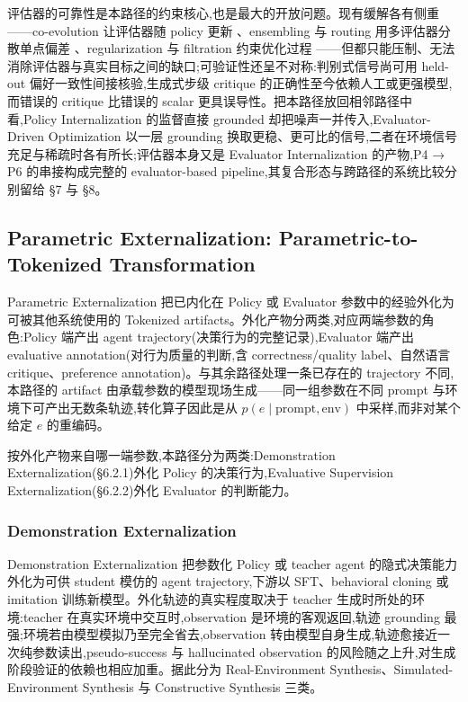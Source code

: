评估器的可靠性是本路径的约束核心,也是最大的开放问题。现有缓解各有侧重——co-evolution 让评估器随 policy 更新 \cite{Yua24, Wu24d, Li26l}、ensembling 与 routing 用多评估器分散单点偏差 \cite{Wu25x, Xu24d}、regularization 与 filtration 约束优化过程 \cite{Ack26, She24c}——但都只能压制、无法消除评估器与真实目标之间的缺口;可验证性还呈不对称:判别式信号尚可用 held-out 偏好一致性间接核验,生成式步级 critique 的正确性至今依赖人工或更强模型,而错误的 critique 比错误的 scalar 更具误导性。把本路径放回相邻路径中看,Policy Internalization 的监督直接 grounded 却把噪声一并传入,Evaluator-Driven Optimization 以一层 grounding 换取更稳、更可比的信号,二者在环境信号充足与稀疏时各有所长;评估器本身又是 Evaluator Internalization 的产物,P4 → P6 的串接构成完整的 evaluator-based pipeline,其复合形态与跨路径的系统比较分别留给 §7 与 §8。

\subsection{Parametric Externalization: Parametric-to-Tokenized Transformation}

Parametric Externalization 把已内化在 Policy 或 Evaluator 参数中的经验外化为可被其他系统使用的 Tokenized artifacts。外化产物分两类,对应两端参数的角色:Policy 端产出 agent trajectory(决策行为的完整记录),Evaluator 端产出 evaluative annotation(对行为质量的判断,含 correctness/quality label、自然语言 critique、preference annotation)。与其余路径处理一条已存在的 trajectory 不同,本路径的 artifact 由承载参数的模型现场生成——同一组参数在不同 prompt 与环境下可产出无数条轨迹,转化算子因此是从 $p(e \mid \text{prompt}, \text{env})$ 中采样,而非对某个给定 $e$ 的重编码。

按外化产物来自哪一端参数,本路径分为两类:Demonstration Externalization(§6.2.1)外化 Policy 的决策行为,Evaluative Supervision Externalization(§6.2.2)外化 Evaluator 的判断能力。

\subsubsection{Demonstration Externalization}

Demonstration Externalization 把参数化 Policy 或 teacher agent 的隐式决策能力外化为可供 student 模仿的 agent trajectory,下游以 SFT、behavioral cloning 或 imitation 训练新模型。外化轨迹的真实程度取决于 teacher 生成时所处的环境:teacher 在真实环境中交互时,observation 是环境的客观返回,轨迹 grounding 最强;环境若由模型模拟乃至完全省去,observation 转由模型自身生成,轨迹愈接近一次纯参数读出,pseudo-success 与 hallucinated observation 的风险随之上升,对生成阶段验证的依赖也相应加重。据此分为 Real-Environment Synthesis、Simulated-Environment Synthesis 与 Constructive Synthesis 三类。

